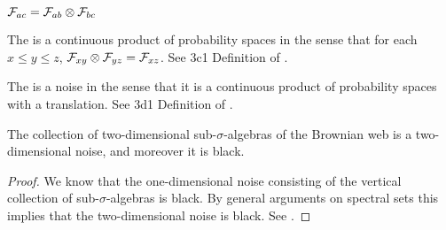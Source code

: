 {\begin{theorem}
  $\mathcal{F}_{a c} = \mathcal{F}_{a b} \otimes \mathcal{F}_{b c}$
\end{theorem}

\begin{theorem}
  The \brownianwebnoise{}
  is a continuous product of probability spaces in the sense that
  for each $x \le y \le z$, $\mathcal{F}_{x y} \otimes \mathcal{F}_{y z} =
  \mathcal{F}_{x z}$.
  See 3c1 Definition of
  \cite{tsirelson-nonclassical-stochastic-flows}.
\end{theorem}

\begin{theorem}
  The \brownianwebnoise{} is a noise in the sense that it is a
  continuous product of probability spaces with a translation.
  See 3d1 Definition of
  \cite{tsirelson-nonclassical-stochastic-flows}.
\end{theorem}


\begin{theorem}
  The collection of two-dimensional sub-$\sigma$-algebras of the
  Brownian web is a two-dimensional noise, and moreover it is black.
\end{theorem}

\begin{proof}
  We know that the one-dimensional noise consisting of the vertical
  collection of sub-$\sigma$-algebras is black.  By general arguments
  on spectral sets this implies that the two-dimensional noise is
  black.  See \cite{tsirelson-classicality-blackness-spectrum}.
\end{proof}

}
